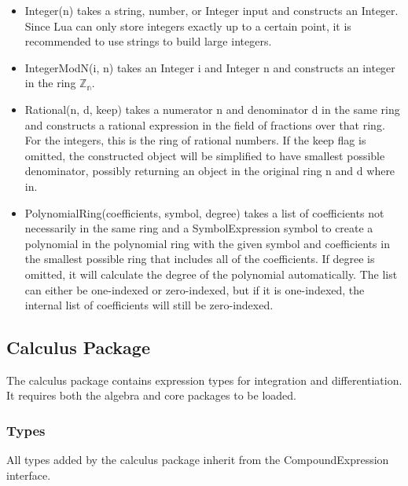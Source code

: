 \documentclass{article}
\begin{document}
\begin{itemize}
    \item {\ttfamily Integer(n)} takes a string, number, or {\ttfamily Integer} input and constructs an Integer. Since Lua can only store integers exactly up to a certain point, it is recommended to use strings to build large integers.
    \item {\ttfamily IntegerModN(i, n)} takes an {\ttfamily Integer i} and {\ttfamily Integer n} and constructs an integer in the ring $\mathbb{Z_n}$. 
    \item {\ttfamily Rational(n, d, keep)} takes a numerator {\ttfamily n} and denominator {\ttfamily d} in the same ring and constructs a rational expression in the field of fractions over that ring. For the integers, this is the ring of rational numbers. If the {\ttfamily keep} flag is omitted, the constructed object will be simplified to have smallest possible denominator, possibly returning an object in the original ring {\ttfamily n} and {\ttfamily d} where in.
    \item {\ttfamily PolynomialRing(coefficients, symbol, degree)} takes a list of {\ttfamily coefficients} not necessarily in the same ring and a {\ttfamily SymbolExpression symbol} to create a polynomial in the polynomial ring with the given {\ttfamily symbol} and coefficients in the smallest possible ring that includes all of the coefficients. If {\ttfamily degree} is omitted, it will calculate the degree of the polynomial automatically. The list can either be one-indexed or zero-indexed, but if it is one-indexed, the internal list of coefficients will still be zero-indexed.
\end{itemize}

\subsection{Calculus Package}

The calculus package contains expression types for integration and differentiation. It requires both the algebra and core packages to be loaded.

\subsubsection{Types}
All types added by the calculus package inherit from the {\ttfamily CompoundExpression} interface.
\end{document}
